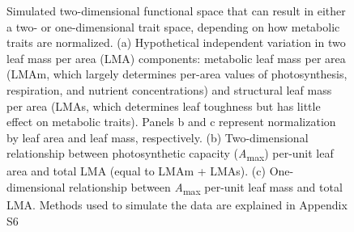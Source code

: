 \documentclass[
  12pt,
  letterpaper,
  DIV=11,
  numbers=noendperiod]{scrartcl}
\begin{document}
\begin{figure}


\caption{\label{fig-hypo}Simulated two-dimensional functional space that
can result in either a two- or one-dimensional trait space, depending on
how metabolic traits are normalized. (a) Hypothetical independent
variation in two leaf mass per area (LMA) components: metabolic leaf
mass per area (LMAm, which largely determines per-area values of
photosynthesis, respiration, and nutrient concentrations) and structural
leaf mass per area (LMAs, which determines leaf toughness but has little
effect on metabolic traits). Panels b and c represent normalization by
leaf area and leaf mass, respectively. (b) Two-dimensional relationship
between photosynthetic capacity (\emph{A}\textsubscript{max}) per-unit
leaf area and total LMA (equal to LMAm + LMAs). (c) One-dimensional
relationship between \emph{A}\textsubscript{max} per-unit leaf mass and
total LMA. Methods used to simulate the data are explained in Appendix
S6}

\end{figure}%

\newpage
\end{document}
